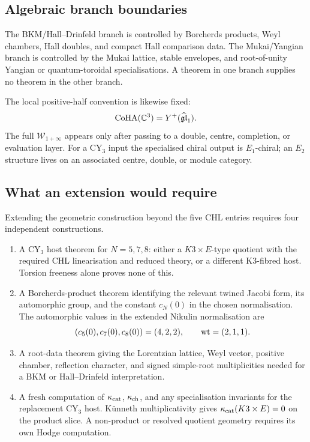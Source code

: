 \subsection*{Algebraic branch boundaries}

The BKM/Hall--Drinfeld branch is controlled by Borcherds products,
Weyl chambers, Hall doubles, and compact Hall comparison data. The
Mukai/Yangian branch is controlled by the Mukai lattice, stable
envelopes, and root-of-unity Yangian or quantum-toroidal
specialisations. A theorem in one branch supplies no theorem in the
other branch.

The local positive-half convention is likewise fixed:
\[
  \mathrm{CoHA}(\mathbb{C}^3)=Y^+(\widehat{\mathfrak{gl}}_1).
\]
The full $\mathcal W_{1+\infty}$ appears only after passing to a
double, centre, completion, or evaluation layer. For a CY$_3$ input
the specialised chiral output is $E_1$-chiral; an $E_2$ structure lives
on an associated centre, double, or module category.

\subsection*{What an extension would require}

Extending the geometric construction beyond the five CHL entries
requires four independent constructions.
\begin{enumerate}[label=\textup{(\alph*)}, leftmargin=1.8em, itemsep=0.4ex]
\item A CY$_3$ host theorem for $N=5,7,8$: either a $K3\times E$-type
quotient with the required CHL linearisation and reduced theory, or a
different K3-fibred host. Torsion freeness alone proves none of this.
\item A Borcherds-product theorem identifying the relevant twined
Jacobi form, its automorphic group, and the constant
$c_N(0)$ in the chosen normalisation. The automorphic values in the
extended Nikulin normalisation are
\[
  (c_5(0),c_7(0),c_8(0))=(4,2,2),
  \qquad
  \operatorname{wt}=(2,1,1).
\]
\item A root-data theorem giving the Lorentzian lattice, Weyl vector,
positive chamber, reflection character, and signed simple-root
multiplicities needed for a BKM or Hall--Drinfeld interpretation.
\item A fresh computation of $\kappa_{\mathrm{cat}}$, $\kappa_{\mathrm{ch}}$, and any specialisation
invariants for the replacement CY$_3$ host. K\"unneth multiplicativity gives
$\kappa_{\mathrm{cat}}(K3\times E)=0$ on the product slice. A non-product or resolved
quotient geometry requires its own Hodge computation.
\end{enumerate}

